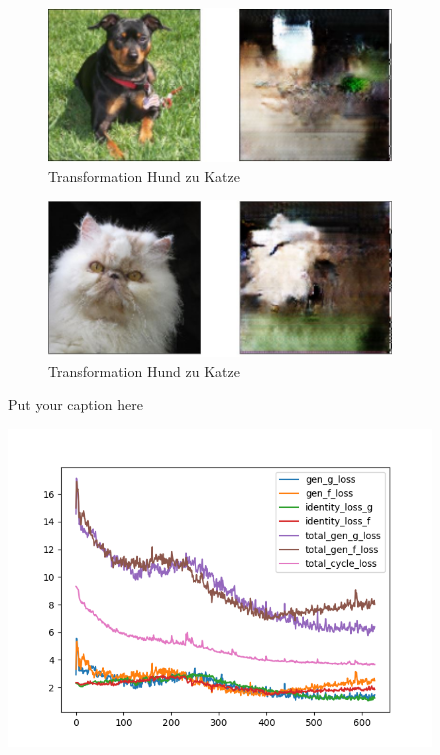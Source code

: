  
 \begin{figure}[ht]
 	\centering
 	\begin{subfigure}{\textwidth}
 		\centering
 		\includegraphics[width=.8\linewidth]{images/dogToCat}  
 		\caption{Transformation Hund zu Katze}
 		\label{fig:sub-dogtocat}
 	\end{subfigure}
 	\newline
 	\begin{subfigure}{\textwidth}
 		\centering
 		\includegraphics[width=.8\linewidth]{images/catToDog}  
 		\caption{Transformation Hund zu Katze}
 		\label{fig:sub-cattodog}
 	\end{subfigure}
 	\caption{Put your caption here}
 \end{figure}
 
 \begin{figure}
 	\centering
 	\includegraphics[width=0.7\linewidth]{images/plot_line_plot_loss}
 	\caption{}
 	\label{fig:cycleganloss}
 \end{figure}
 
